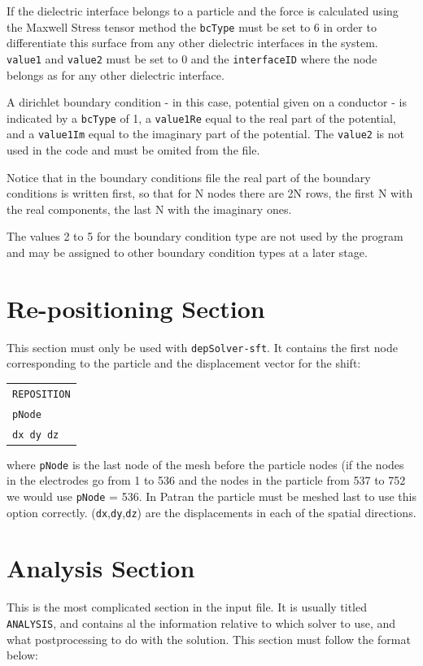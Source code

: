 \documentclass[12pt]{report}
\begin{document}
If the dielectric interface belongs to a particle and the force is calculated using the Maxwell Stress tensor method the \verb+bcType+ must be set to 6 in order to differentiate this surface from any other dielectric interfaces in the system. \verb+value1+ and \verb+value2+ must be set to 0 and the \verb+interfaceID+ where the node belongs as for any other dielectric interface.

A dirichlet boundary condition - in this case, potential given on a conductor - is indicated by a \verb+bcType+ of 1, a \verb+value1Re+ equal to the real part of the potential, and a \verb+value1Im+ equal to the imaginary part of the potential. The \verb+value2+ is not used in the code and must be omited from the file.

Notice that in the boundary conditions file the real part of the boundary conditions is written first, so that for N nodes there are 2N rows, the first N with the real components, the last N with the imaginary ones.

The values 2 to 5 for the boundary condition type are not used by the program and may be assigned to other boundary condition types at a later stage.

\section{Re-positioning Section}
This section must only be used with \verb+depSolver-sft+. It contains the first node corresponding to the particle and the displacement vector for the shift:

\begin{tabular}{l}
\texttt{REPOSITION}\\
\texttt{pNode}\\
\texttt{dx dy dz}
\end{tabular}

where \verb+pNode+ is the last node of the mesh before the particle nodes (if the nodes in the electrodes go from 1 to 536 and the nodes in the particle from 537 to 752 we would use \verb+pNode+ = 536. In Patran the particle must be meshed last to use this option correctly. (\verb+dx+,\verb+dy+,\verb+dz+) are the displacements in each of the spatial directions. 

\section{Analysis Section}
This is the most complicated section in the input file. It is usually titled \verb+ANALYSIS+, and contains al the information relative to which solver to use, and what postprocessing to do with the solution. This section must follow the format below:
\end{document}
